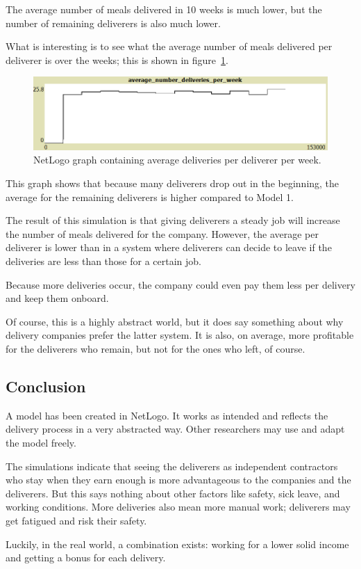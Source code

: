 The average number of meals delivered in 10 weeks is much lower, but the number of remaining deliverers is also much lower.

What is interesting is to see what the average number of meals delivered per deliverer is over the weeks; this is shown in figure~\ref{fig:average}.

\begin{figure}
\centering
\includegraphics[width=12cm]{sections/pics/average}
\caption{NetLogo  graph containing average deliveries per deliverer per week.}
\label{fig:average}
\end{figure}

This graph shows that because many deliverers drop out in the beginning, the average for the remaining deliverers is higher compared to Model 1.

The result of this simulation is that giving deliverers a steady job will increase the number of meals delivered for the company.
However, the average per deliverer is lower than in a system where deliverers can decide to leave if the deliveries are less than those for a certain job.

Because more deliveries occur, the company could even pay them less per delivery and keep them onboard.

Of course, this is a highly abstract world, but it does say something about why delivery companies prefer the latter system.
It is also, on average, more profitable for the deliverers who remain, but not for the ones who left, of course.

\subsection{Conclusion}\label{subsec:conclusion}
A model has been created in NetLogo. It works as intended and reflects the delivery process in a very abstracted way.
Other researchers may use and adapt the model freely.

The simulations indicate that seeing the deliverers as independent contractors who stay when they earn enough is more advantageous to the companies and the deliverers.
But this says nothing about other factors like safety, sick leave, and working conditions.
More deliveries also mean more manual work; deliverers may get fatigued and risk their safety.

Luckily, in the real world, a combination exists: working for a lower solid income and getting a bonus for each delivery.






